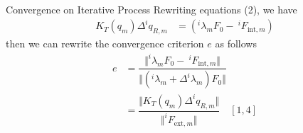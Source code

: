 \documentclass[
10pt,
aspectratio=169,
]{beamer}
\begin{document}
\begin{frame}{Convergence on Iterative Process}
    Rewriting equations (2), we have
    \begin{align}
        K_T(q_m)\Delta^iq_{R,m} &= \left(^i\lambda_m F_0 - \:^iF_{\text{int},m}\right) 
    \end{align} \pause
    then we can rewrite the convergence criterion \(e\) as follows
    \begin{align*}
        e &= \dfrac{\Vert ^i\lambda_m F_0 - \:^iF_{\text{int},m}\Vert}{\Vert (^i\lambda_m + \Delta^i\lambda_m)F_0\Vert}\\
        &= \dfrac{\Vert K_T(q_m)\Delta^iq_{R,m}\Vert}{\Vert ^iF_{\text{ext},m}\Vert} \quad [1,4]
    \end{align*} \pause
    
\end{frame}
\end{document}

